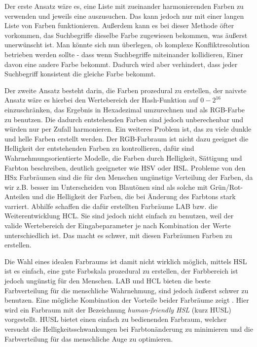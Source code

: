 \documentclass[12pt,twoside]{book}
\begin{document}
Der erste Ansatz wäre es, eine Liste mit zueinander harmonierenden Farben zu verwenden und jeweils eine auszusuchen. Das kann jedoch nur mit einer langen Liste von Farben funktionieren. Außerdem kann es bei dieser Methode öfter vorkommen, das Suchbegriffe dieselbe Farbe zugewiesen bekommen, was äußerst unerwünscht ist. Man könnte sich nun überlegen, ob komplexe Konfliktresolution betrieben werden sollte - dass wenn Suchbegriffe miteinander kollidieren, Einer davon eine andere Farbe bekommt.
Dadurch wird aber verhindert, dass jeder Suchbegriff konsistent die gleiche Farbe bekommt.


Der zweite Ansatz besteht darin, die Farben prozedural zu erstellen,
der naivste Ansatz wäre es hierbei den Wertebereich der Hash-Funktion auf $0 - 2^{16}$ einzuschränken, das Ergebnis in Hexadezimal umzurechnen und als RGB-Farbe zu benutzen. Die dadurch entstehenden Farben sind jedoch unberechenbar und würden nur per Zufall harmonieren. Ein weiteres Problem ist, das zu viele dunkle und helle Farben erstellt werden.
Der RGB-Farbraum ist nicht dazu geeignet die Helligkeit der entstehenden Farben zu kontrollieren, dafür sind Wahrnehmungsorientierte Modelle, die Farben durch Helligkeit, Sättigung und Farbton beschreiben, deutlich geeigneter wie HSV oder HSL.
Probleme von den HSx Farbräumen sind die für den Menschen ungünstige Verteilung der Farben, da wir z.B. besser im Unterscheiden von Blautönen sind als solche mit Grün/Rot-Anteilen und die Helligkeit der Farben, die bei Änderung des Farbtons stark varriert.
Abhilfe schaffen die dafür erstellten Farbräume LAB bzw. die Weiterentwicklung HCL. Sie sind jedoch nicht einfach zu benutzen, weil der valide Wertebereich der Eingabeparameter je nach Kombination der Werte unterschiedlich ist. Das macht es schwer, mit diesen Farbräumen Farben zu erstellen.

Die Wahl eines idealen Farbraums ist damit nicht wirklich möglich, mittels HSL ist es einfach, eine gute Farbskala prozedural zu erstellen, der Farbbereich ist jedoch ungünstig für den Menschen. LAB und HCL bieten die beste Farbverteilung für die menschliche Wahrnehmung, sind jedoch äußerst schwer zu benutzen. Eine mögliche Kombination der Vorteile beider Farbräume zeigt \citep{husl}. Hier wird ein Farbraum mit der Bezeichnung \textit{human-friendly HSL} (kurz HUSL) vorgestellt. HUSL bietet einen einfach zu bedienenden Farbraum, welcher versucht die Helligkeitsschwankungen bei Farbtonänderung zu minimieren und die Farbverteilung für das menschliche Auge zu optimieren.
\end{document}
